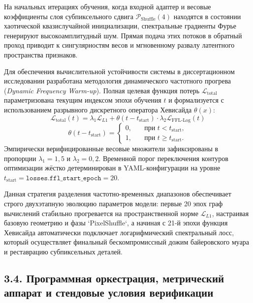 \documentclass[12pt,a4paper]{article}
\begin{document}
На начальных итерациях обучения, когда входной адаптер и весовые коэффициенты слоя субпиксельного сдвига $\mathcal{P}_{\operatorname{Shuffle}}(4)$ находятся в состоянии хаотической квазислучайной инициализации, спектральные градиенты Фурье генерируют высокоамплитудный шум. Прямая подача этих потоков в обратный проход приводит к сингулярностям весов и мгновенному развалу латентного пространства признаков.

Для обеспечения вычислительной устойчивости системы в диссертационном исследовании разработана методология динамического частотного прогрева (\textit{Dynamic Frequency Warm-up}). Полная целевая функция потерь $\mathcal{L}_{\operatorname{total}}$ параметризована текущим индексом эпохи обучения $t$ и формализуется с использованием разрывного дискретного оператора Хевисайда $\theta(x)$:
\begin{equation}
\mathcal{L}_{\operatorname{total}}(t) = \lambda_{1} \mathcal{L}_{L1} + \theta(t - t_{\operatorname{start}}) \cdot \lambda_{2} \mathcal{L}_{\operatorname{FFL-Log}}(t)
\end{equation}
\begin{equation}
\theta(t - t_{\operatorname{start}}) = \begin{cases} 
0, & \quad \text{при } t < t_{\operatorname{start}}, \\ 
1, & \quad \text{при } t \ge t_{\operatorname{start}}. 
\end{cases}
\end{equation}
Эмпирически верифицированные весовые множители зафиксированы в пропорции $\lambda_1 = 1{,}5$ и $\lambda_2 = 0{,}2$. Временной порог переключения контуров оптимизации жёстко детерминирован в YAML-конфигурации на уровне $t_{\operatorname{start}} = \texttt{losses.ffl\_start\_epoch} = 20$. 

Данная стратегия разделения частотно-временных диапазонов обеспечивает строго двухэтапную эволюцию параметров модели: первые 20 эпох граф вычислений стабильно прогревается на пространственной норме $\mathcal{L}_{L1}$, настраивая базовую геометрию и фазы `PixelShuffle`, а начиная с 21-й эпохи функция Хевисайда автоматически подключает логарифмический спектральный лосс, который осуществляет финальный бескомпромиссный дожим байеровского муара и реставрацию субпиксельных деталей.

\subsection{3.4. Программная оркестрация, метрический аппарат и стендовые условия верификации}
\end{document}
